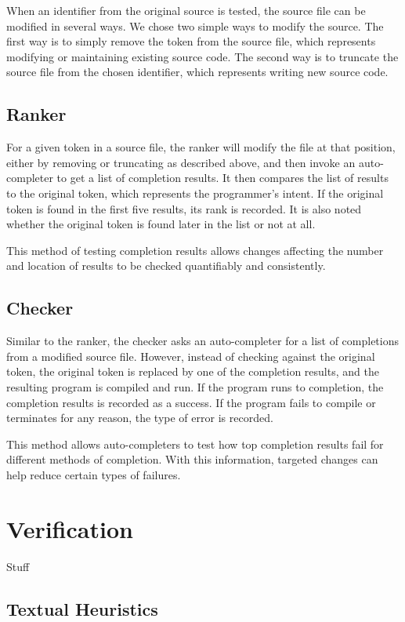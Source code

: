 \documentclass[ms,electronic,twosidetoc,letterpaper,chaptercenter,parttop,lol,lof,lot]{byumsphd}
\begin{document}
When an identifier from the original source is tested, the source file can be modified in several ways. We chose two simple ways to modify the source. The first way is to simply remove the token from the source file, which represents modifying or maintaining existing source code. The second way is to truncate the source file from the chosen identifier, which represents writing new source code.

\section{Ranker}

For a given token in a source file, the ranker will modify the file at that position, either by removing or truncating as described above, and then invoke an auto-completer to get a list of completion results. It then compares the list of results to the original token, which represents the programmer's intent. If the original token is found in the first five results, its rank is recorded. It is also noted whether the original token is found later in the list or not at all.

This method of testing completion results allows changes affecting the number and location of results to be checked quantifiably and consistently.

\section{Checker}

Similar to the ranker, the checker asks an auto-completer for a list of completions from a modified source file. However, instead of checking against the original token, the original token is replaced by one of the completion results, and the resulting program is compiled and run. If the program runs to completion, the completion results is recorded as a success. If the program fails to compile or terminates for any reason, the type of error is recorded.

This method allows auto-completers to test how top completion results fail for different methods of completion. With this information, targeted changes can help reduce certain types of failures.

\chapter{Verification}

Stuff

\section{Textual Heuristics}
\end{document}
